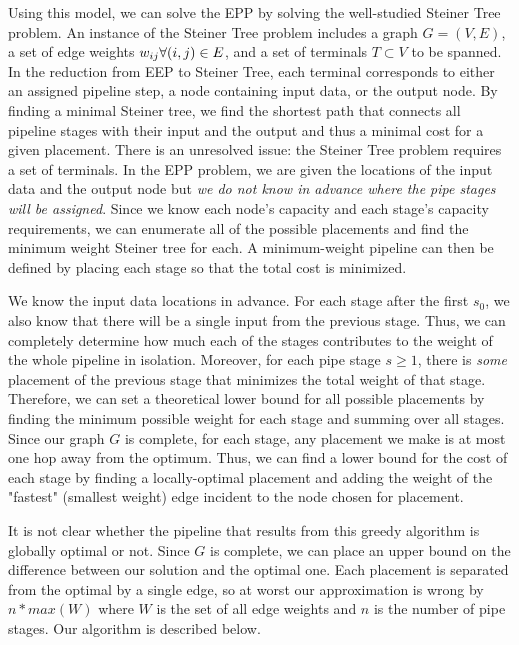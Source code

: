 \documentclass{article}
\newcommand{\foralle}[2]{\ensuremath{\forall (#1,#2) \in E }}
\begin{document}
	Using this model, we can solve the EPP by solving the well-studied Steiner Tree problem. An instance of the Steiner Tree problem includes a graph $G = (V,E)$, a set of edge weights $w_{ij} \space \foralle{i}{j}$, and a set of terminals $T \subset V$ to be spanned. In the reduction from EEP to Steiner Tree, each terminal corresponds to either an assigned pipeline step, a node containing input data, or the output node. By finding a minimal Steiner tree, we find the shortest path that connects all pipeline stages with their input and the output and thus a minimal cost for a given placement. There is an unresolved issue: the Steiner Tree problem requires a set of terminals. In the EPP problem, we are given the locations of the input data and the output node but \textit{we do not know in advance where the pipe stages will be assigned}. Since we know each node's capacity and each stage's capacity requirements, we can enumerate all of the possible placements and find the minimum weight Steiner tree for each. A minimum-weight pipeline can then be defined by placing each stage so that the total cost is minimized.
	
	We know the input data locations in advance. For each stage after the first $s_{0}$, we also know that there will be a single input from the previous stage. Thus, we can completely determine how much each of the stages contributes to the weight of the whole pipeline in isolation. Moreover, for each pipe stage $s \ge 1$, there is \textit{some} placement of the previous stage that minimizes the total weight of that stage. Therefore, we can set a theoretical lower bound for all possible placements by finding the minimum possible weight for each stage and summing over all stages. Since our graph $G$ is complete, for each stage, any placement we make is at most one hop away from the optimum. Thus, we can find a lower bound for the cost of each stage by finding a locally-optimal placement and adding the weight of the "fastest" (smallest weight) edge incident to the node chosen for placement.
	
	It is not clear whether the pipeline that results from this greedy algorithm is globally optimal or not. Since $G$ is complete, we can place an upper bound on the difference between our solution and the optimal one. Each placement is separated from the optimal by a single edge, so at worst our approximation is wrong by $n * max(W)$ where $W$ is the set of all edge weights and $n$ is the number of pipe stages. Our algorithm is described below.
	
\end{document}
